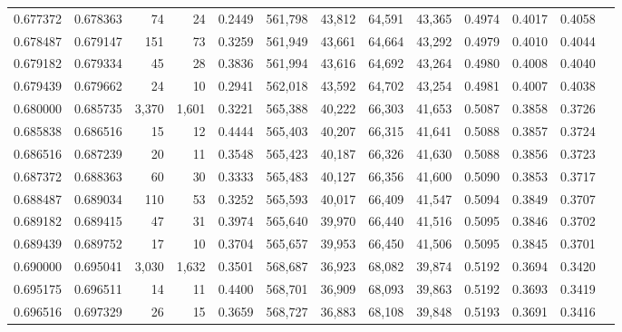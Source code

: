\begin{tabular}{rrrrrrrrrrrrr}
0.677372 & 0.678363 &     74 &    24 &                                     0.2449 & 561,798 &  43,812 &  64,591 &  43,365 & 0.4974 & 0.4017 & 0.4058 \\
0.678487 & 0.679147 &    151 &    73 &                                     0.3259 & 561,949 &  43,661 &  64,664 &  43,292 & 0.4979 & 0.4010 & 0.4044 \\
0.679182 & 0.679334 &     45 &    28 &                                     0.3836 & 561,994 &  43,616 &  64,692 &  43,264 & 0.4980 & 0.4008 & 0.4040 \\
0.679439 & 0.679662 &     24 &    10 &                                     0.2941 & 562,018 &  43,592 &  64,702 &  43,254 & 0.4981 & 0.4007 & 0.4038 \\
0.680000 & 0.685735 &  3,370 & 1,601 &                                     0.3221 & 565,388 &  40,222 &  66,303 &  41,653 & 0.5087 & 0.3858 & 0.3726 \\
0.685838 & 0.686516 &     15 &    12 &                                     0.4444 & 565,403 &  40,207 &  66,315 &  41,641 & 0.5088 & 0.3857 & 0.3724 \\
0.686516 & 0.687239 &     20 &    11 &                                     0.3548 & 565,423 &  40,187 &  66,326 &  41,630 & 0.5088 & 0.3856 & 0.3723 \\
0.687372 & 0.688363 &     60 &    30 &                                     0.3333 & 565,483 &  40,127 &  66,356 &  41,600 & 0.5090 & 0.3853 & 0.3717 \\
0.688487 & 0.689034 &    110 &    53 &                                     0.3252 & 565,593 &  40,017 &  66,409 &  41,547 & 0.5094 & 0.3849 & 0.3707 \\
0.689182 & 0.689415 &     47 &    31 &                                     0.3974 & 565,640 &  39,970 &  66,440 &  41,516 & 0.5095 & 0.3846 & 0.3702 \\
0.689439 & 0.689752 &     17 &    10 &                                     0.3704 & 565,657 &  39,953 &  66,450 &  41,506 & 0.5095 & 0.3845 & 0.3701 \\
0.690000 & 0.695041 &  3,030 & 1,632 &                                     0.3501 & 568,687 &  36,923 &  68,082 &  39,874 & 0.5192 & 0.3694 & 0.3420 \\
0.695175 & 0.696511 &     14 &    11 &                                     0.4400 & 568,701 &  36,909 &  68,093 &  39,863 & 0.5192 & 0.3693 & 0.3419 \\
0.696516 & 0.697329 &     26 &    15 &                                     0.3659 & 568,727 &  36,883 &  68,108 &  39,848 & 0.5193 & 0.3691 & 0.3416 \\

\end{tabular}
